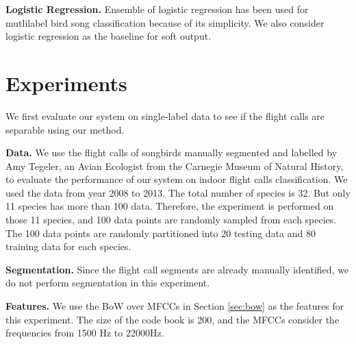 \documentclass{article} %
\begin{document}
\textbf{Logistic Regression.} Ensemble of logistic regression has been used for mutlilabel bird song classification \cite{Massaron13} because of its simplicity. We also consider logistic regression as the baseline for soft output.



\section{Experiments}
We first evaluate our system on single-label data to see if the flight calls are separable using our method.

\textbf{Data.} 
We use the flight calls of songbirds manually segmented and labelled by Amy Tegeler, an Avian Ecologist from the Carnegie Museum of Natural History, to evaluate the performance of our system on indoor flight calls classification. We used the data from year 2008 to 2013. The total number of species is 32. But only 11 species has more than 100 data. Therefore, the experiment is performed on those 11 species, and 100 data points are randomly sampled from each species. The 100 data points are randomly partitioned into 20 testing data and 80 training data for each species.


\textbf{Segmentation.}
Since the flight call segments are already manually identified, we do not perform segmentation in this experiment.

\textbf{Features.}
We use the BoW over MFCCs in Section \ref{sec:bow} as the features for this experiment. The size of the code book is 200, and the MFCCs consider the frequencies from 1500 Hz to 22000Hz.
\end{document}
